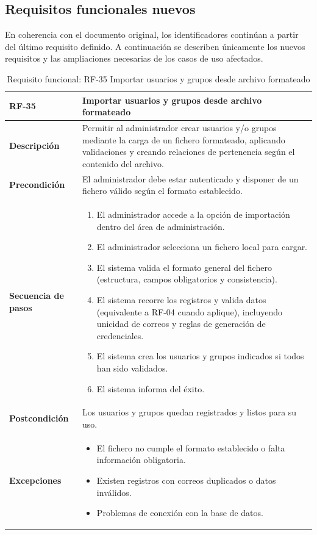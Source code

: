 \subsection{Requisitos funcionales nuevos}
\label{sec:rf_extensiones}

En coherencia con el documento original, los identificadores continúan a partir del último requisito definido. A continuación se describen únicamente los nuevos requisitos y las ampliaciones necesarias de los casos de uso afectados.

\begin{table}[H]
\centering
\begin{tabularx}{\textwidth}{
  |>{\centering\arraybackslash}l
  |>{\centering\arraybackslash}X|}
\hline
\textbf{RF-35} & \textbf{Importar usuarios y grupos desde archivo formateado} \\ \hline
\textbf{Descripción} & Permitir al administrador crear usuarios y/o grupos mediante la carga de un fichero formateado, aplicando validaciones y creando relaciones de pertenencia según el contenido del archivo. \\ \hline
\textbf{Precondición} & El administrador debe estar autenticado y disponer de un fichero válido según el formato establecido. \\ \hline
\textbf{Secuencia de pasos} &
\begin{enumerate}
  \item El administrador accede a la opción de importación dentro del área de administración.
  \item El administrador selecciona un fichero local para cargar.
  \item El sistema valida el formato general del fichero (estructura, campos obligatorios y consistencia).
  \item El sistema recorre los registros y valida datos (equivalente a RF-04 cuando aplique), incluyendo unicidad de correos y reglas de generación de credenciales.
  \item El sistema crea los usuarios y grupos indicados si todos han sido validados.
  \item El sistema informa del éxito.
\end{enumerate} \\ \hline
\textbf{Postcondición} & Los usuarios y grupos quedan registrados y listos para su uso. \\ \hline
\textbf{Excepciones} &
\begin{itemize}
  \item El fichero no cumple el formato establecido o falta información obligatoria.
  \item Existen registros con correos duplicados o datos inválidos.
  \item Problemas de conexión con la base de datos.
\end{itemize} \\ \hline
\end{tabularx}
\caption{{Requisito funcional: RF-35 Importar usuarios y grupos desde archivo formateado}}
\end{table}

